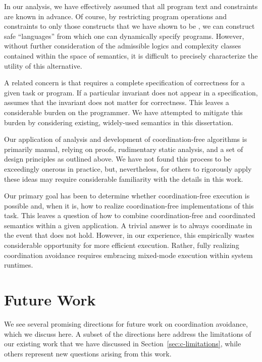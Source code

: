  In our \iconfluence analysis, we have
effectively assumed that all program text and constraints are known in
advance. Of course, by restricting program operations and constraints
to only those constructs that we have shown to be \iconfluent, we can
construct safe ``languages'' from which one can dynamically specify
programs. However, without further consideration of the admissible
logics and complexity classes contained within the space of
\iconfluent semantics, it is difficult to precisely characterize the
utility of this alternative.

 A related concern is that
\iconfluence requires a complete specification of correctness for a
given task or program. If a particular invariant does not appear in a
specification, \iconfluence assumes that the invariant does not matter
for correctness. This leaves a considerable burden on the
programmer. We have attempted to mitigate this burden by considering
existing, widely-used semantics in this dissertation.

 Our application of \iconfluence analysis and
development of coordination-free algorithms is primarily manual,
relying on proofs, rudimentary static analysis, and a set of design
principles as outlined above. We have not found this process to be
exceedingly onerous in practice, but, nevertheless, for others to
rigorously apply these ideas may require considerable familiarity with
the details in this work.


 Our primary goal has been to determine
whether coordination-free execution is possible and, when it is, how
to realize coordination-free implementations of this task. This leaves
a question of how to combine coordination-free and coordinated
semantics within a given application. A trivial answer is to always
coordinate in the event that \iconfluence does not hold. However, in
our experience, this empirically wastes considerable opportunity for
more efficient execution. Rather, fully realizing coordination
avoidance requires embracing mixed-mode execution within system
runtimes.

\section{Future Work}
\label{sec:c-futurework}

We see several promising directions for future work on coordination
avoidance, which we discuss here. A subset of the directions here
address the limitations of our existing work that we have discussed in
Section~\ref{sec:c-limitations}, while others represent new questions
arising from this work.

